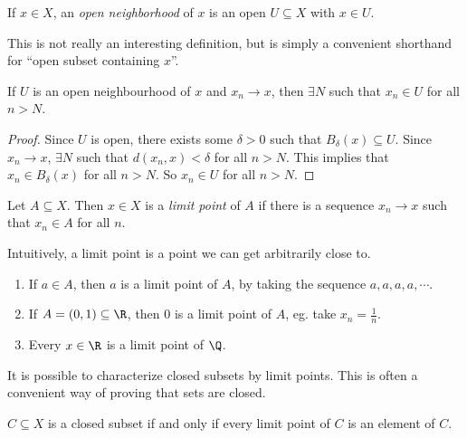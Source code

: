 \documentclass[a4paper]{article}
\begin{document}
\begin{defi}
  If $x\in X$, an \emph{open neighborhood} of $x$ is an open $U\subseteq X$ with $x\in U$.
\end{defi}
This is not really an interesting definition, but is simply a convenient shorthand for ``open subset containing $x$''.

\begin{lemma}
  If $U$ is an open neighbourhood of $x$ and $x_n \to x$, then $\exists N$ such that $x_n \in U$ for all $n > N$.
\end{lemma}

\begin{proof}
  Since $U$ is open, there exists some $\delta > 0$ such that $B_\delta(x)\subseteq U$. Since $x_n \to x$, $\exists N$ such that $d(x_n, x) < \delta$ for all $n > N$. This implies that $x_n \in B_\delta(x)$ for all $n > N$. So $x_n \in U$ for all $n > N$.
\end{proof}

\begin{defi}
  Let $A\subseteq X$. Then $x\in X$ is a \emph{limit point} of $A$ if there is a sequence $x_n \to x$ such that $x_n \in A$ for all $n$.
\end{defi}
Intuitively, a limit point is a point we can get arbitrarily close to.

\begin{eg}\leavevmode
  \begin{enumerate}
    \item If $a\in A$, then $a$ is a limit point of $A$, by taking the sequence $a, a, a, a, \cdots$.
    \item If $A = (0, 1)\subseteq \R$, then $0$ is a limit point of $A$, eg. take $x_n = \frac{1}{n}$.
    \item Every $x\in \R$ is a limit point of $\Q$.
  \end{enumerate}
\end{eg}

It is possible to characterize closed subsets by limit points. This is often a convenient way of proving that sets are closed. 
\begin{prop}
  $C\subseteq X$ is a closed subset if and only if every limit point of $C$ is an element of $C$.
\end{prop}
\end{document}
